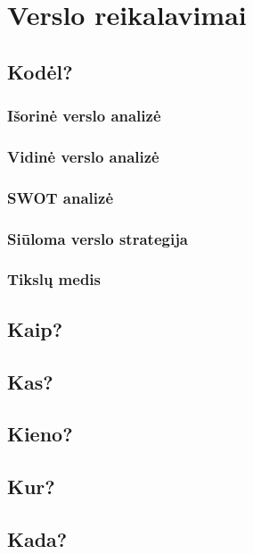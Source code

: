 \documentclass{VUMIFPSkursinis}
\begin{document}
\section{Verslo reikalavimai}
	
	\subsection{Kodėl?}

		\subsubsection{Išorinė verslo analizė}

		\subsubsection{Vidinė verslo analizė}

		\subsubsection{SWOT analizė}

		\subsubsection{Siūloma verslo strategija}

		\subsubsection{Tikslų medis}

	\subsection{Kaip?}

	\subsection{Kas?}

	\subsection{Kieno?}

	\subsection{Kur?}

	\subsection{Kada?}
\end{document}
